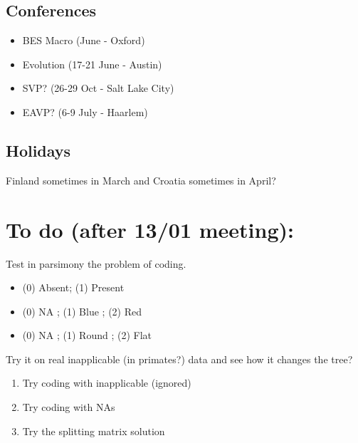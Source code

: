 \documentclass[a4paper,11pt]{article}
\begin{document}
\subsection{Conferences}
\begin{itemize}
\item BES Macro (June - Oxford)
\item Evolution (17-21 June - Austin)
\item SVP? (26-29 Oct - Salt Lake City)
\item EAVP? (6-9 July - Haarlem)
\end{itemize}
\subsection{Holidays}
Finland sometimes in March and Croatia sometimes in April?





\section{To do (after 13/01 meeting):}
Test in parsimony the problem of coding.
\begin{itemize}
\item (0) Absent; (1) Present
\item (0) NA ; (1) Blue ; (2) Red
\item (0) NA ; (1) Round ; (2) Flat
\end{itemize}

Try it on real inapplicable (in primates?) data and see how it changes the tree?
\begin{enumerate}
\item Try coding with inapplicable (ignored)
\item Try coding with NAs
\item Try the splitting matrix solution
\end{enumerate}




\end{document}
